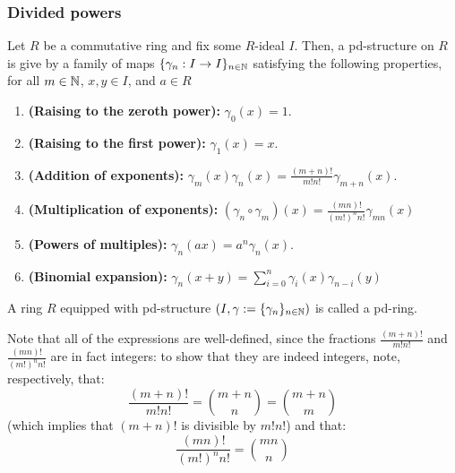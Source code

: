             \subsubsection{Divided powers}
                \begin{definition}
                    Let $R$ be a commutative ring and fix some $R$-ideal $I$. Then, a pd-structure on $R$ is give by a family of maps $\{\gamma_n: I \to I\}_{n \in \mathbb{N}}$ satisfying the following properties, for all $m \in \mathbb{N}$, $x, y \in I$, and $a \in R$
                        \begin{enumerate}
                            \item \textbf{(Raising to the zeroth power):} $\gamma_0(x) = 1$.
                            \item \textbf{(Raising to the first power):} $\gamma_1(x) = x$.
                            \item \textbf{(Addition of exponents):} $\gamma_m(x)\gamma_n(x) = \frac{(m + n)!}{m!n!} \gamma_{m + n}(x)$.
                            \item \textbf{(Multiplication of exponents):} $(\gamma_n \circ \gamma_m)(x) = \frac{(mn)!}{(m!)^n n!} \gamma_{mn}(x)$
                            \item \textbf{(Powers of multiples):} $\gamma_n(ax) = a^n\gamma_n(x)$.
                            \item \textbf{(Binomial expansion):} $\gamma_n(x + y) = \sum_{i=0}^n \gamma_i(x)\gamma_{n - i}(y)$
                        \end{enumerate}
                    A ring $R$ equipped with pd-structure $\left(I, \gamma := \{\gamma_n\}_{n \in \mathbb{N}}\right)$ is called a pd-ring. 
                \end{definition}
                \begin{remark}
                    Note that all of the expressions are well-defined, since the fractions $\frac{(m + n)!}{m!n!}$ and $\frac{(mn)!}{(m!)^n n!}$ are in fact integers: to show that they are indeed integers, note, respectively, that:
                        $$\frac{(m + n)!}{m!n!} = \binom{m + n}{n} = \binom{m + n}{m}$$
                    (which implies that $(m + n)!$ is divisible by $m!n!$) and that:
                        $$\frac{(mn)!}{(m!)^n n!} = \binom{mn}{n}$$
                \end{remark}
                

